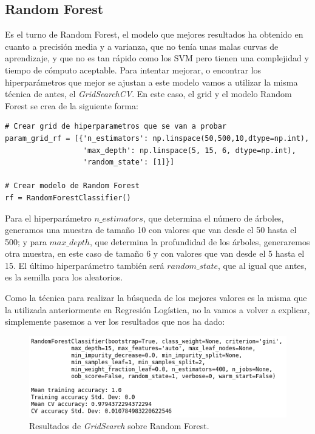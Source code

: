 \documentclass[11pt,a4paper]{article}
\begin{document}
\subsection{Random Forest}

Es el turno de Random Forest, el modelo que mejores resultados ha obtenido en cuanto a precisión media y a varianza, que no tenía unas
malas curvas de aprendizaje, y que no es tan rápido como los SVM pero tienen una complejidad y tiempo de cómputo aceptable. Para intentar
mejorar, o encontrar los hiperparámetros que mejor se ajustan a este modelo vamos a utilizar la misma técnica de antes, el
\textit{GridSearchCV}. En este caso, el grid y el modelo Random Forest se crea de la siguiente forma:

\begin{lstlisting}
# Crear grid de hiperparametros que se van a probar
param_grid_rf = [{'n_estimators': np.linspace(50,500,10,dtype=np.int),
                  'max_depth': np.linspace(5, 15, 6, dtype=np.int),
                  'random_state': [1]}]

# Crear modelo de Random Forest
rf = RandomForestClassifier()

\end{lstlisting}

Para el hiperparámetro $n\_estimators$, que determina el número de árboles, generamos una muestra de tamaño 10 con valores que van desde el
50 hasta el 500; y para $max\_depth$, que determina la profundidad de los árboles, generaremos otra muestra, en este caso de tamaño 6 y con
valores que van desde el 5 hasta el 15. El último hiperparámetro también será $random\_state$, que al igual que antes, es la semilla para
los aleatorios.

Como la técnica para realizar la búsqueda de los mejores valores es la misma que la utilizada anteriormente en Regresión Logística, no la
vamos a volver a explicar, simplemente pasemos a ver los resultados que nos ha dado:

\begin{figure}[H]
    \centering
    \includegraphics[scale=0.6]{img/gs-rf.png}
    \caption{Resultados de \textit{GridSearch} sobre Random Forest.}
    \label{fig:gs-rf}
\end{figure}
\end{document}
